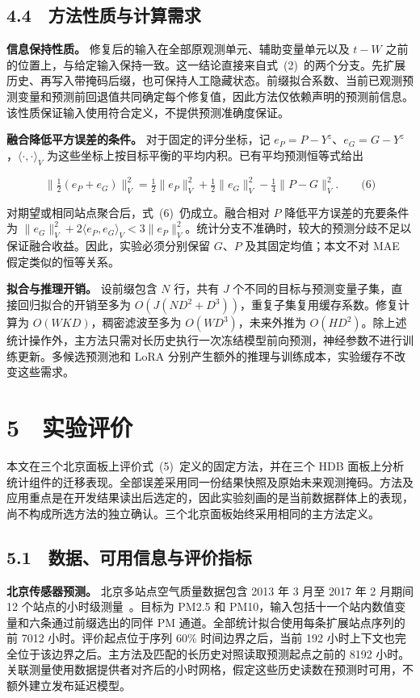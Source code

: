 \subsection{4.4　方法性质与计算需求}


\textbf{信息保持性质。}
修复后的输入在全部原观测单元、辅助变量单元以及 $t-W$ 之前的位置上，与给定输入保持一致。这一结论直接来自式~(2)~的两个分支。先扩展历史、再写入带掩码后缀，也可保持人工隐藏状态。前缀拟合系数、当前已观测预测变量和预测前回退值共同确定每个修复值，因此方法仅依赖声明的预测前信息。该性质保证输入使用符合定义，不提供预测准确度保证。

\textbf{融合降低平方误差的条件。}
对于固定的评分坐标，记 $e_P=P-Y^z$、$e_G=G-Y^z$，$\langle\cdot,\cdot\rangle_V$ 为这些坐标上按目标平衡的平均内积。已有平均预测恒等式给出


\[\|\tfrac12(e_P+e_G)\|_V^2
 =\tfrac12\|e_P\|_V^2+\tfrac12\|e_G\|_V^2
 -\tfrac14\|P-G\|_V^2.\qquad\text{(6)}\]


对期望或相同站点聚合后，式~(6)~仍成立。融合相对 $P$ 降低平方误差的充要条件为 $\|e_G\|_V^2+2\langle e_P,e_G\rangle_V<3\|e_P\|_V^2$。统计分支不准确时，较大的预测分歧不足以保证融合收益。因此，实验必须分别保留 $G$、$P$ 及其固定均值；本文不对 MAE 假定类似的恒等关系。

\textbf{拟合与推理开销。}
设前缀包含 $N$ 行，共有 $J$ 个不同的目标与预测变量子集，直接回归拟合的开销至多为 $O(J(ND^2+D^3))$，重复子集复用缓存系数。修复计算为 $O(WKD)$，稠密滤波至多为 $O(WD^3)$，未来外推为 $O(HD^2)$。除上述统计操作外，主方法只需对长历史执行一次冻结模型前向预测，神经参数不进行训练更新。多候选预测池和 LoRA 分别产生额外的推理与训练成本，实验缓存不改变这些需求。

\section{5　实验评价}


本文在三个北京面板上评价式~(5)~定义的固定方法，并在三个 HDB 面板上分析统计组件的迁移表现。全部误差采用同一份结果快照及原始未来观测掩码。方法及应用重点是在开发结果读出后选定的，因此实验刻画的是当前数据群体上的表现，尚不构成所选方法的独立确认。三个北京面板始终采用相同的主方法定义。

\subsection{5.1　数据、可用信息与评价指标}

\textbf{北京传感器预测。}
北京多站点空气质量数据包含 2013 年 3 月至 2017 年 2 月期间 12 个站点的小时级测量~\citep{uci2017beijing}。目标为 PM2.5 和 PM10，输入包括十一个站内数值变量和六条通过前缀选出的同伴 PM 通道。全部统计拟合使用每条扩展站点序列的前 7012 小时。评价起点位于序列 60\% 时间边界之后，当前 192 小时上下文也完全位于该边界之后。主方法及匹配的长历史对照读取预测起点之前的 8192 小时。关联测量使用数据提供者对齐后的小时网格，假定这些历史读数在预测时可用，不额外建立发布延迟模型。

